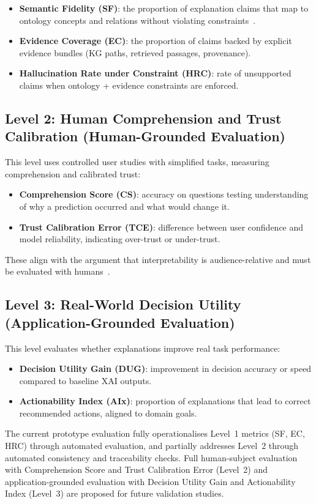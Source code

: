 \documentclass[lnbip]{svmultln}
\begin{document}
\begin{itemize}
    \item \textbf{Semantic Fidelity (SF)}: the proportion of explanation claims that map to ontology concepts and relations without violating constraints~\cite{confalonieri2021}.
    \item \textbf{Evidence Coverage (EC)}: the proportion of claims backed by explicit evidence bundles (KG paths, retrieved passages, provenance).
    \item \textbf{Hallucination Rate under Constraint (HRC)}: rate of unsupported claims when ontology + evidence constraints are enforced.
\end{itemize}

\subsection{Level 2: Human Comprehension and Trust Calibration (Human-Grounded Evaluation)}
This level uses controlled user studies with simplified tasks, measuring comprehension and calibrated trust:
\begin{itemize}
    \item \textbf{Comprehension Score (CS)}: accuracy on questions testing understanding of why a prediction occurred and what would change it.
    \item \textbf{Trust Calibration Error (TCE)}: difference between user confidence and model reliability, indicating over-trust or under-trust.
\end{itemize}
These align with the argument that interpretability is audience-relative and must be evaluated with humans~\cite{doshi2017,miller2019}.

\subsection{Level 3: Real-World Decision Utility (Application-Grounded Evaluation)}
This level evaluates whether explanations improve real task performance:
\begin{itemize}
    \item \textbf{Decision Utility Gain (DUG)}: improvement in decision accuracy or speed compared to baseline XAI outputs.
    \item \textbf{Actionability Index (AIx)}: proportion of explanations that lead to correct recommended actions, aligned to domain goals.
\end{itemize}

The current prototype evaluation fully operationalises Level~1 metrics (SF, EC, HRC) through automated evaluation, and partially addresses Level~2 through automated consistency and traceability checks. Full human-subject evaluation with Comprehension Score and Trust Calibration Error (Level~2) and application-grounded evaluation with Decision Utility Gain and Actionability Index (Level~3) are proposed for future validation studies.
\end{document}
